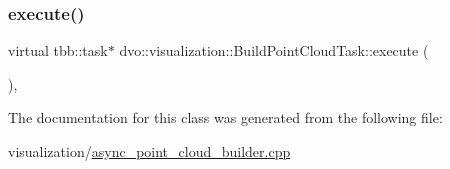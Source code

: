 \subsubsection{\texorpdfstring{execute()}{execute()}}
{\footnotesize\ttfamily virtual tbb\+::task$\ast$ dvo\+::visualization\+::\+Build\+Point\+Cloud\+Task\+::execute (\begin{DoxyParamCaption}{ }\end{DoxyParamCaption})\hspace{0.3cm}{\ttfamily [inline]}, {\ttfamily [virtual]}}



The documentation for this class was generated from the following file\+:\begin{DoxyCompactItemize}
\item 
visualization/\mbox{\hyperlink{async__point__cloud__builder_8cpp}{async\+\_\+point\+\_\+cloud\+\_\+builder.\+cpp}}\end{DoxyCompactItemize}
